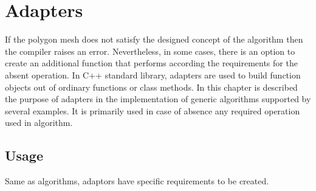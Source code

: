 \chapter{Adapters}

If the polygon mesh does not satisfy the designed concept of the algorithm then the compiler
raises an error. Nevertheless, in some cases, there is an option to create an additional function
that performs according the requirements for the absent operation.
In C++ standard library, adapters are used to build function objects out of ordinary
functions or class methods.\cite{Simonis2000}
In this chapter is described the purpose of adapters in the implementation of generic algorithms
supported by several examples. It is primarily used in case of absence any required operation
used in algorithm.

\section{Usage}

Same as algorithms, adaptors have specific requirements to be created.
